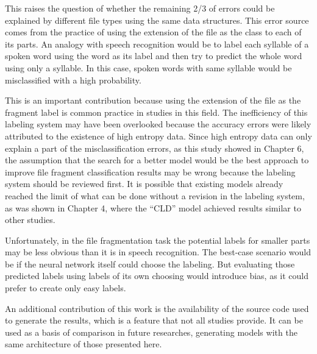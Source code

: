 This raises the question of whether the remaining 2/3 of errors could be explained by different file types using the same data structures. This error source comes from the practice of using the extension of the file as the class to each of its parts. An analogy with speech recognition would be to label each syllable of a spoken word using the word as its label and then try to predict the whole word using only a syllable. In this case, spoken words with same syllable would be misclassified with a high probability.

This is an important contribution because using the extension of the file as the fragment label is common practice in studies in this field. The inefficiency of this labeling system may have been overlooked because the accuracy errors were likely attributed to the existence of high entropy data. Since high entropy data can only explain a part of the misclassification errors, as this study showed in Chapter 6, the assumption that the search for a better model would be the best approach to improve file fragment classification results may be wrong because the labeling system should be reviewed first. It is possible that existing models already reached the limit of what can be done without a revision in the labeling system, as was shown in Chapter 4, where the ``CLD'' model achieved results similar to other studies.

Unfortunately, in the file fragmentation task the potential labels for smaller parts may be less obvious than it is in speech recognition. The best-case scenario would be if the neural network itself could choose the labeling. But evaluating those predicted labels using labels of its own choosing would introduce bias, as it could prefer to create only easy labels.

An additional contribution of this work is the availability of the source code used to generate the results, which is a feature that not all studies provide. It can be used as a basis of comparison in future researches, generating models with the same architecture of those presented here.